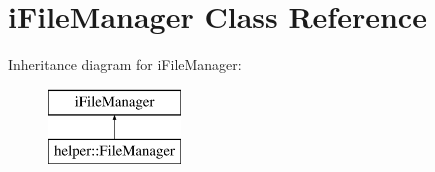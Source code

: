 \hypertarget{classi_file_manager}{}\section{i\+File\+Manager Class Reference}
\label{classi_file_manager}
Inheritance diagram for i\+File\+Manager\+:\begin{figure}[H]
\begin{center}
\leavevmode
\includegraphics[height=2.000000cm]{classi_file_manager}
\end{center}
\end{figure}
